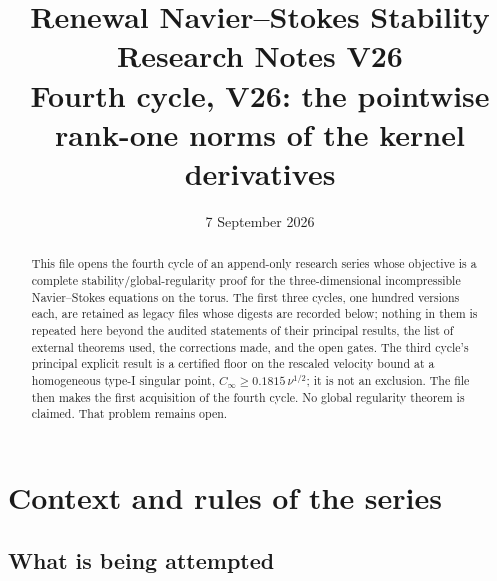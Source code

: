 \documentclass[11pt]{article}
\title{\textbf{Renewal Navier--Stokes Stability Research Notes V26}\\[0.35em]
\large Fourth cycle, V26: the pointwise rank-one norms of the kernel derivatives}
\author{}
\date{7 September 2026}
\theoremstyle{plain}
\theoremstyle{definition}
\theoremstyle{remark}
\begin{document}
\maketitle

\begin{abstract}
This file opens the fourth cycle of an append-only research series
whose objective is a complete stability/global-regularity proof for the
three-dimensional incompressible Navier--Stokes equations on the torus.
The first three cycles, one hundred versions each, are retained as
legacy files whose digests are recorded below; nothing in them is
repeated here beyond the audited statements of their principal
results, the list of external theorems used, the corrections made,
and the open gates.  The third cycle's principal explicit result is
a certified floor on the rescaled velocity bound at a homogeneous
type-I singular point, \(C_\infty\ge0.1815\,\nu^{1/2}\); it is not an exclusion.
The file then makes the first acquisition of the fourth cycle.  No
global regularity theorem is claimed.  That problem remains open.
\end{abstract}

\tableofcontents

\section{Context and rules of the series}
\label{sec:c4v1-context}

\subsection{What is being attempted}
\end{document}
